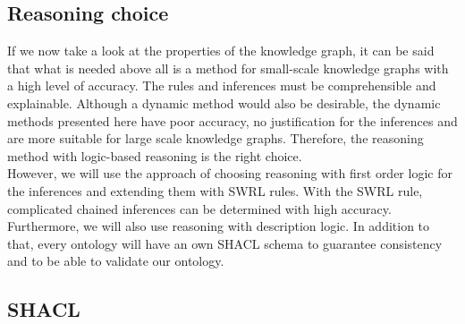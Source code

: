 \documentclass[
  a4paper,  %
  twoside,  %
  bibliography=totoc,
  headsepline,
  cleardoublepage=empty,
  parskip=half,
  draft=false
]{scrbook}
\begin{document}
\subsection{Reasoning choice}\label{sec:reasoning_choice}
If we now take a look at the properties of the knowledge graph, it can be said that what is needed above all is a method for small-scale knowledge graphs with a high level of accuracy. The rules and inferences must be comprehensible and explainable. Although a dynamic method would also be desirable, the dynamic methods presented here have poor accuracy, no justification for the inferences and are more suitable for large scale knowledge graphs. Therefore, the reasoning method with logic-based reasoning is the right choice. \\
However, we will use the approach of choosing reasoning with first order logic for the inferences and extending them with SWRL rules. With the SWRL rule, complicated chained inferences can be determined with high accuracy. Furthermore, we will also use reasoning with description logic. In addition to that, every ontology will have an own SHACL schema to guarantee consistency and to be able to validate our ontology. 

\subsection{\acrfull{SHACL}}\label{sec:SHACL}
\end{document}
